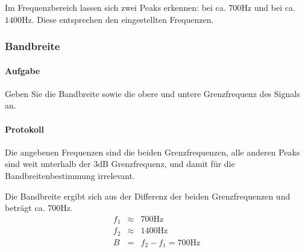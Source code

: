 \documentclass[10pt]{scrreprt}
\begin{document}
        Im Frequenzbereich lassen sich zwei Peaks erkennen: bei ca. $700\si{\hertz}$
        und bei ca. $1400\si{\hertz}$. Diese entsprechen den eingestellten
        Frequenzen.

        \subsubsection{Bandbreite}
        \paragraph{Aufgabe}
        Geben Sie die Bandbreite sowie die obere und untere Grenzfrequenz des Signals an.
        \paragraph{Protokoll}
        Die angebenen Frequenzen sind die beiden Grenzfrequenzen, alle anderen
        Peaks sind weit unterhalb der $3$dB Grenzfrequenz, und damit für die
        Bandbreitenbestimmung irrelevant.

        Die Bandbreite ergibt sich aus der Differenz der beiden Grenzfrequenzen
        und beträgt ca. $700\si{\hertz}$.
        \begin{eqnarray*}
            f_1 &\approx& 700\si{\hertz}\\
            f_2 &\approx& 1400\si{\hertz}\\
            B &=& f_2 - f_1 = 700\si{\hertz}
        \end{eqnarray*}
\end{document}
